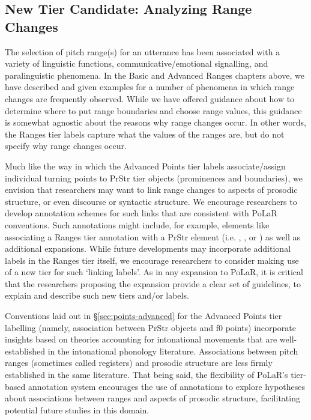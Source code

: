 \documentclass[11pt, twoside]{memoir}
\def\textlabel#1{{\relsize{-.5}\fontspec[Mapping=tex-text]{Roboto Mono}{#1}}}
\begin{document}
\subsection{New Tier Candidate: Analyzing Range Changes}\label{sec:new-tier-range-changes}
The selection of pitch range(s) for an utterance has been associated with a variety of linguistic functions, communicative\slash emotional signalling, and paralinguistic phenomena. In the Basic and Advanced Ranges chapters above, we have described and given examples for a number of phenomena in which range changes are frequently observed.  While we have offered guidance about how to determine where to put range boundaries and choose range values, this guidance is somewhat agnostic about the reasons why range changes occur. In other words, the Ranges tier labels capture what the values of the ranges are, but do not specify why range changes occur. 

Much like the way in which the Advanced Points tier labels associate\slash assign individual turning points to PrStr tier objects (prominences and boundaries), we envision that researchers may want to link range changes to aspects of prosodic structure, or even discourse or syntactic structure. We encourage researchers to develop annotation schemes for such links that are consistent with PoLaR conventions. Such annotations might include, for example, elements like associating a Ranges tier annotation with a PrStr element (i.e. \textlabel{*}, \textlabel{[}, or \textlabel{]}) as well as additional expansions. While future developments may incorporate additional labels in the Ranges tier itself, we encourage researchers to consider making use of a new tier for such ‘linking labels’. As in any expansion to PoLaR, it is critical that the researchers proposing the expansion provide a clear set of guidelines, to explain and describe such new tiers and/or labels.

Conventions laid out in §\ref{sec:points-advanced} for the Advanced Points tier labelling (namely, association between PrStr objects and f0 points) incorporate insights based on theories accounting for intonational movements that are well-established in the intonational phonology literature. Associations between pitch ranges (sometimes called registers) and prosodic structure are less firmly established in the same literature. That being said, the flexibility of PoLaR’s tier-based annotation system encourages the use of annotations to explore hypotheses about associations between ranges and aspects of prosodic structure, facilitating potential future studies in this domain. 
\end{document}
